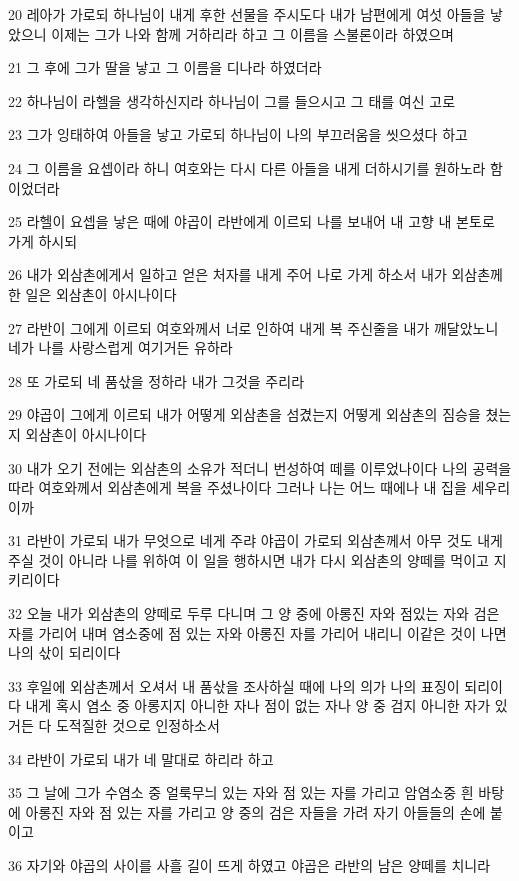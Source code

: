 \par 20 레아가 가로되 하나님이 내게 후한 선물을 주시도다 내가 남편에게 여섯 아들을 낳았으니 이제는 그가 나와 함께 거하리라 하고 그 이름을 스불론이라 하였으며
\par 21 그 후에 그가 딸을 낳고 그 이름을 디나라 하였더라
\par 22 하나님이 라헬을 생각하신지라 하나님이 그를 들으시고 그 태를 여신 고로
\par 23 그가 잉태하여 아들을 낳고 가로되 하나님이 나의 부끄러움을 씻으셨다 하고
\par 24 그 이름을 요셉이라 하니 여호와는 다시 다른 아들을 내게 더하시기를 원하노라 함이었더라
\par 25 라헬이 요셉을 낳은 때에 야곱이 라반에게 이르되 나를 보내어 내 고향 내 본토로 가게 하시되
\par 26 내가 외삼촌에게서 일하고 얻은 처자를 내게 주어 나로 가게 하소서 내가 외삼촌께 한 일은 외삼촌이 아시나이다
\par 27 라반이 그에게 이르되 여호와께서 너로 인하여 내게 복 주신줄을 내가 깨달았노니 네가 나를 사랑스럽게 여기거든 유하라
\par 28 또 가로되 네 품삯을 정하라 내가 그것을 주리라
\par 29 야곱이 그에게 이르되 내가 어떻게 외삼촌을 섬겼는지 어떻게 외삼촌의 짐승을 쳤는지 외삼촌이 아시나이다
\par 30 내가 오기 전에는 외삼촌의 소유가 적더니 번성하여 떼를 이루었나이다 나의 공력을 따라 여호와께서 외삼촌에게 복을 주셨나이다 그러나 나는 어느 때에나 내 집을 세우리이까
\par 31 라반이 가로되 내가 무엇으로 네게 주랴 야곱이 가로되 외삼촌께서 아무 것도 내게 주실 것이 아니라 나를 위하여 이 일을 행하시면 내가 다시 외삼촌의 양떼를 먹이고 지키리이다
\par 32 오늘 내가 외삼촌의 양떼로 두루 다니며 그 양 중에 아롱진 자와 점있는 자와 검은 자를 가리어 내며 염소중에 점 있는 자와 아롱진 자를 가리어 내리니 이같은 것이 나면 나의 삯이 되리이다
\par 33 후일에 외삼촌께서 오셔서 내 품삯을 조사하실 때에 나의 의가 나의 표징이 되리이다 내게 혹시 염소 중 아롱지지 아니한 자나 점이 없는 자나 양 중 검지 아니한 자가 있거든 다 도적질한 것으로 인정하소서
\par 34 라반이 가로되 내가 네 말대로 하리라 하고
\par 35 그 날에 그가 수염소 중 얼룩무늬 있는 자와 점 있는 자를 가리고 암염소중 흰 바탕에 아롱진 자와 점 있는 자를 가리고 양 중의 검은 자들을 가려 자기 아들들의 손에 붙이고
\par 36 자기와 야곱의 사이를 사흘 길이 뜨게 하였고 야곱은 라반의 남은 양떼를 치니라
